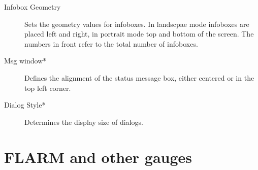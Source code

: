 \begin{description}
\item[Infobox Geometry]  Sets the geometry values for infoboxes. In landscpae
mode infoboxes are placed left and right, in portrait mode top and bottom of the screen. The numbers in front refer 
to the total number of infoboxes.
\item[Msg window*]  Defines the alignment of the status message box, either
centered or in the top left corner.
\item[Dialog Style*]  Determines the display size of dialogs.
\end{description}


\clearpage
\section{FLARM and other gauges}\label{sec:vario-gauge}

